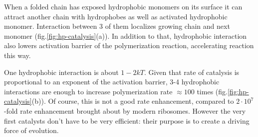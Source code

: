 \documentclass[twoside,twocolumn,9pt]{article}
\begin{document}
When a folded chain has exposed hydrophobic monomers on its surface it can attract another chain 
with hydrophobes as well as activated hydrophobic monomer. Interaction between 3 of them localizes 
growing chain and next monomer (fig.\ref{fig:hp-catalysis}(a)). In addition to that, hydrophobic 
interaction also lowers activation barrier of the polymerization reaction, accelerating reaction 
this way.

One hydrophobic interaction is about $1-2kT$. Given that rate of catalysis is proportional to an 
exponent of the activation barrier, 3-4 hydrophobic interactions are enough to increase 
polymerization rate $\approx 100$ times (fig.\ref{fig:hp-catalysis}(b)). 
Of course, this is not a good rate enhancement, compared to $2\cdot10^7$-fold rate enhancement 
brought about
by modern ribosomes\cite{Sievers2004a}. However the very 
first catalysts don't have to be very efficient: their purpose is to create a driving force of 
evolution.
\end{document}
